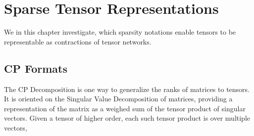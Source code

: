 \section{Sparse Tensor Representations}\label{cha:sparseTC}

We in this chapter investigate, which sparsity notations enable tensors to be representable as contractions of tensor networks.


\subsection{CP Formats}

The CP Decomposition is one way to generalize the ranks of matrices to tensors.
It is oriented on the Singular Value Decomposition of matrices, providing a representation of the matrix as a weighed sum of the tensor product of singular vectors.
Given a tensor of higher order, each such tensor product is over multiple vectors, 


